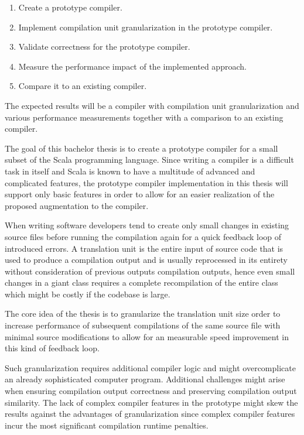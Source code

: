 \documentclass{VUMIFPSbakalaurinis}
\begin{document}
\begin{enumerate}
\item{Create a prototype compiler.}
\item{Implement compilation unit granularization in the prototype compiler.}
\item{Validate correctness for the prototype compiler.}
\item{Measure the performance impact of the implemented approach.}
\item{Compare it to an existing compiler.}
\end{enumerate}

The expected results will be a compiler with compilation unit granularization and various performance measurements together with a comparison to an existing compiler.

The goal of this bachelor thesis is to create a prototype compiler for a small subset of the Scala programming language.
Since writing a compiler is a difficult task in itself and Scala is known to have a multitude of advanced and complicated features\cite{ScalaSpec}, the prototype compiler implementation in this thesis will support only basic features in order to allow for an easier realization of the proposed augmentation to the compiler.

When writing software developers tend to create only small changes in existing source files before running the compilation again for a quick feedback loop of introduced errors.
A translation unit is the entire input of source code that is used to produce a compilation output and is usually reprocessed in its entirety without consideration of previous outputs compilation outputs, hence even small changes in a giant class requires a complete recompilation of the entire class which might be costly if the codebase is large.

The core idea of the thesis is to granularize the translation unit size order to increase performance of subsequent compilations of the same source file with minimal source modifications to allow for an measurable speed improvement in this kind of feedback loop.

Such granularization requires additional compiler logic and might overcomplicate an already sophisticated computer program.
Additional challenges might arise when ensuring compilation output correctness and preserving compilation output similarity.
The lack of complex compiler features in the prototype might skew the results against the advantages of granularization since complex compiler features incur the most significant compilation runtime penalties.
\end{document}
